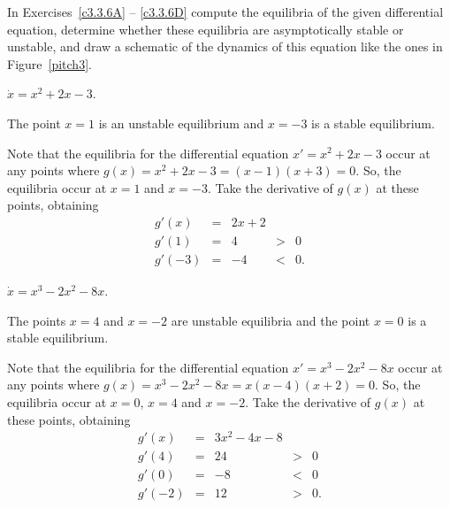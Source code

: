 \documentclass{ximera}
\begin{document}
\noindent In Exercises~\ref{c3.3.6A} -- \ref{c3.3.6D} compute the equilibria 
of the given differential equation, determine whether these equilibria are 
asymptotically stable or unstable, and draw a sche\-ma\-tic of the dynamics 
of this equation like the ones in Figure~\ref{pitch3}.  
\begin{exercise} \label{c3.3.6A}
$\dot{x} = x^2 + 2x - 3$.

\begin{solution}

\ans The point $x = 1$ is an unstable equilibrium and $x = -3$ is a stable
equilibrium.

\soln Note that the equilibria for the differential equation
$x' = x^2 + 2x - 3$ occur at any points where
$g(x) = x^2 + 2x - 3 = (x - 1)(x + 3) = 0$.
So, the equilibria occur at $x = 1$ and $x = -3$.  Take the
derivative of $g(x)$ at these points, obtaining
\[
\begin{array}{rcccl}
g'(x) & = & 2x + 2 \\
g'(1) & = & 4 & > & 0 \\
g'(-3) & = & -4 & < & 0.\end{array}
\]


\end{solution}
\end{exercise}
\begin{exercise} \label{c3.3.6B}
$\dot{x} = x^3 - 2x^2 - 8x$.

\begin{solution}

\ans The points $x=4$ and $x = -2$ are unstable equilibria and the point 
$x = 0$ is a stable equilibrium.

\soln Note that the equilibria for the differential equation
$x' = x^3 - 2x^2 - 8x$ occur at any points where
$g(x) = x^3 - 2x^2 - 8x = x(x - 4)(x + 2) = 0$.
So, the equilibria occur at $x=0$, $x = 4$ and $x = -2$.  Take the
derivative of $g(x)$ at these points, obtaining
\[
\begin{array}{rcccl}
g'(x) & = & 3x^2-4x-8 \\
g'(4) & = & 24 & > & 0 \\
g'(0) & = & -8 & < & 0\\
g'(-2) & = & 12 & > & 0.\end{array}
\]

\end{solution}
\end{exercise}
\end{document}
